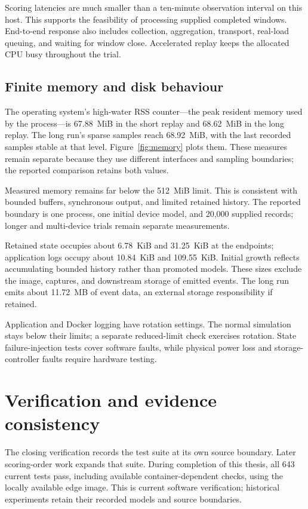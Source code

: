 Scoring latencies are much smaller than a ten-minute observation
interval on this host. This supports the feasibility of processing
supplied completed windows. End-to-end response also includes collection,
aggregation, transport, real-load queuing, and waiting for window close.
Accelerated replay keeps the allocated CPU busy throughout the trial.

\subsection{Finite memory and disk behaviour}

The operating system's high-water RSS counter---the peak resident memory
used by the process---is 67.88~MiB in the short replay and 68.62~MiB in
the long replay. The long run's sparse samples reach 68.92~MiB,
with the last recorded samples stable at that level.
Figure~\ref{fig:memory} plots them. These measures remain separate
because they use different interfaces and sampling boundaries; the
reported comparison retains both values.



Measured memory remains far below the 512~MiB limit. This is
consistent with bounded buffers, synchronous output, and limited
retained history. The reported boundary is one process, one initial device
model, and 20,000 supplied records; longer and multi-device trials remain
separate measurements.

Retained state occupies about 6.78~KiB and 31.25~KiB at the endpoints;
application logs occupy about 10.84~KiB and 109.55~KiB. Initial
growth reflects accumulating bounded history rather than promoted
models. These sizes exclude the image, captures, and downstream
storage of emitted events. The long run emits about 11.72~MB of
event data, an external storage responsibility if retained.

Application and Docker logging have rotation settings. The normal
simulation stays below their limits; a separate reduced-limit check
exercises rotation. State failure-injection tests cover software faults,
while physical power loss and storage-controller faults require hardware
testing.

\section{Verification and evidence consistency}
\label{sec:verification-results}

The closing verification records the test suite at its own source
boundary. Later scoring-order work expands that suite. During
completion of this thesis, all 643 current tests pass, including
available container-dependent checks, using the locally available
edge image. This is current software verification; historical experiments
retain their recorded models and source boundaries.

